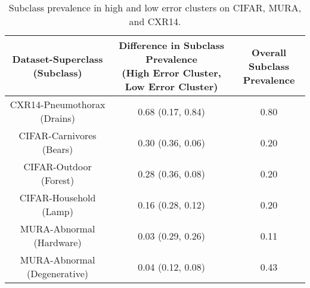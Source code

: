 \documentclass[sigconf]{acmart}
\begin{document}
 \begin{table*}[]
 \centering
\begin{tabular}{ccc}
\toprule
 Dataset-Superclass (Subclass) & \makecell{Difference in Subclass Prevalence \\ (High Error Cluster, Low Error Cluster)}  & \makecell{Overall Subclass \\ Prevalence} \\
 \toprule
 CXR14-Pneumothorax (Drains) & 0.68 (0.17, 0.84) & 0.80\\
 CIFAR-Carnivores (Bears) & 0.30 (0.36, 0.06) & 0.20\\
 CIFAR-Outdoor (Forest) & 0.28 (0.36, 0.08) & 0.20\\
 CIFAR-Household (Lamp) & 0.16 (0.28, 0.12) & 0.20\\
 MURA-Abnormal (Hardware) & 0.03 (0.29, 0.26) & 0.11\\
 MURA-Abnormal (Degenerative) & 0.04 (0.12, 0.08) & 0.43\\
 \toprule
\end{tabular}
\caption{ Subclass prevalence in high and low error clusters on CIFAR, MURA, and CXR14.}
\label{tab:clustercifar-1}
\end{table*}


%
\end{document}
